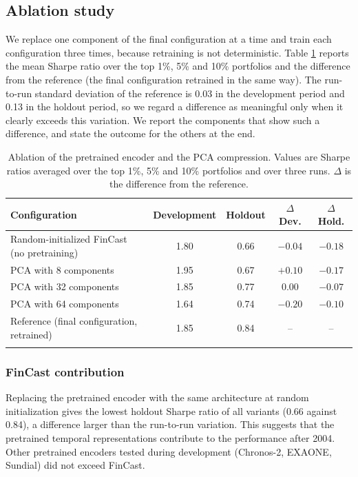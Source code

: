 \documentclass[pdflatex,sn-mathphys-num]{sn-jnl}%
\theoremstyle{thmstyleone}%
\theoremstyle{thmstyletwo}%
\theoremstyle{thmstylethree}%
\begin{document}
\subsection{Ablation study}\label{subsec4_3}
We replace one component of the final configuration at a time and train each configuration three times, because retraining is not deterministic. Table \ref{tab:ablation} reports the mean Sharpe ratio over the top 1\%, 5\% and 10\% portfolios and the difference from the reference (the final configuration retrained in the same way). The run-to-run standard deviation of the reference is 0.03 in the development period and 0.13 in the holdout period, so we regard a difference as meaningful only when it clearly exceeds this variation. We report the components that show such a difference, and state the outcome for the others at the end.

\begin{table}[h]
\caption{Ablation of the pretrained encoder and the PCA compression. Values are Sharpe ratios averaged over the top 1\%, 5\% and 10\% portfolios and over three runs. $\Delta$ is the difference from the reference.}\label{tab:ablation}%
\small
\begin{tabular}{@{}lcccc@{}}
\toprule
Configuration & Development & Holdout & $\Delta$ Dev. & $\Delta$ Hold. \\
\midrule
Random-initialized FinCast (no pretraining) & 1.80 & 0.66 & $-0.04$ & $-0.18$ \\
PCA with 8 components & 1.95 & 0.67 & $+0.10$ & $-0.17$ \\
PCA with 32 components & 1.85 & 0.77 & $0.00$ & $-0.07$ \\
PCA with 64 components & 1.64 & 0.74 & $-0.20$ & $-0.10$ \\
\midrule
Reference (final configuration, retrained) & 1.85 & 0.84 & -- & -- \\
\botrule
\end{tabular}
\end{table}

\subsubsection{FinCast contribution}
Replacing the pretrained encoder with the same architecture at random initialization gives the lowest holdout Sharpe ratio of all variants (0.66 against 0.84), a difference larger than the run-to-run variation. This suggests that the pretrained temporal representations contribute to the performance after 2004. Other pretrained encoders tested during development (Chronos-2, EXAONE, Sundial) did not exceed FinCast.
\end{document}
